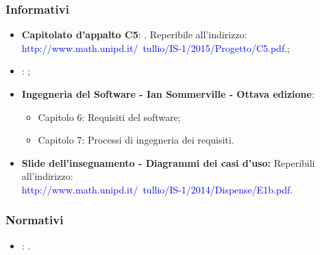 \subsubsection{Informativi}
\begin{itemize}
\item
\textbf{Capitolato d'appalto C5}: \progetto. Reperibile all'indirizzo: \\
\textcolor{blue}{http://www.math.unipd.it/~tullio/IS-1/2015/Progetto/C5.pdf}.;
\item
\textbf{\SdF}: \textit{\SdF};
\item
\textbf{Ingegneria del Software - Ian Sommerville - Ottava edizione}:
	\begin{itemize}
		\item Capitolo 6: Requisiti del software;
		\item Capitolo 7: Processi di ingegneria dei requisiti.
	\end{itemize} 
\item
\textbf{Slide dell’insegnamento - Diagrammi dei casi d’uso:}  Reperibili all'indirizzo: \\ \textcolor{blue}{http://www.math.unipd.it/~tullio/IS-1/2014/Dispense/E1b.pdf}.
\end{itemize}

\subsubsection{Normativi}
\begin{itemize}
\item
\textbf{\NdP}: \textit{\NdP}. 
\end{itemize}